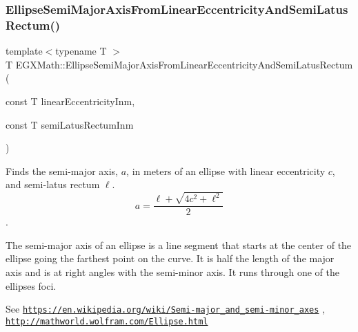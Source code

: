 \mbox{\label{group___e_g_x_math-_geometry-2_d-_ellipse-_semi_major_axis_gad5fde13ad96aede92a1c476d373bc295}} 
\subsubsection{\texorpdfstring{Ellipse\+Semi\+Major\+Axis\+From\+Linear\+Eccentricity\+And\+Semi\+Latus\+Rectum()}{EllipseSemiMajorAxisFromLinearEccentricityAndSemiLatusRectum()}}
{\footnotesize\ttfamily template$<$typename T $>$ \\
T E\+G\+X\+Math\+::\+Ellipse\+Semi\+Major\+Axis\+From\+Linear\+Eccentricity\+And\+Semi\+Latus\+Rectum (\begin{DoxyParamCaption}\item[{const T}]{linear\+Eccentricity\+Inm,  }\item[{const T}]{semi\+Latus\+Rectum\+Inm }\end{DoxyParamCaption})}



Finds the semi-\/major axis, $a$, in meters of an ellipse with linear eccentricity $c$, and semi-\/latus rectum $\ell$. \[ a=\dfrac{\ell+\sqrt{4c^2+\ell^2}}{2} \]. 

The semi-\/major axis of an ellipse is a line segment that starts at the center of the ellipse going the farthest point on the curve. It is half the length of the major axis and is at right angles with the semi-\/minor axis. It runs through one of the ellipses foci.

See \href{https://en.wikipedia.org/wiki/Semi-major_and_semi-minor_axes}{\tt https\+://en.\+wikipedia.\+org/wiki/\+Semi-\/major\+\_\+and\+\_\+semi-\/minor\+\_\+axes} , \href{http://mathworld.wolfram.com/Ellipse.html}{\tt http\+://mathworld.\+wolfram.\+com/\+Ellipse.\+html}


